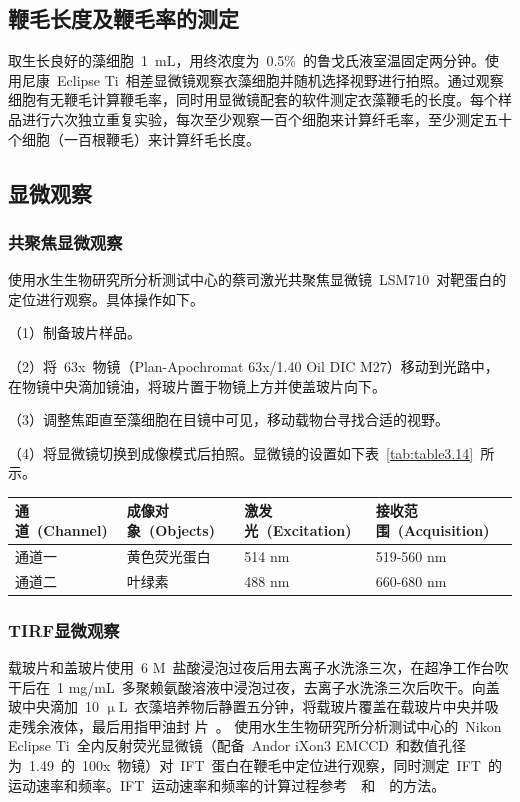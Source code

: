 \subsection{鞭毛长度及鞭毛率的测定}
取生长良好的藻细胞\ \SI{1}{\mL}，用终浓度为\ 0.5\%\ 的鲁戈氏液室温固定两分钟。使用尼康\ Eclipse Ti\ 相差显微镜观察衣藻细胞并随机选择视野进行拍照。通过观察细胞有无鞭毛计算鞭毛率，同时用显微镜配套的软件测定衣藻鞭毛的长度。每个样品进行六次独立重复实验，每次至少观察一百个细胞来计算纤毛率，至少测定五十个细胞（一百根鞭毛）来计算纤毛长度。

\subsection{显微观察}\label{subsec:microscope}
\subsubsection{共聚焦显微观察}
使用水生生物研究所分析测试中心的蔡司激光共聚焦显微镜\ LSM710\ 对靶蛋白的定位进行观察。具体操作如下。

（1）制备玻片样品。

（2）将\ 63x\ 物镜（Plan-Apochromat 63x/1.40 Oil DIC M27）移动到光路中，在物镜中央滴加镜油，将玻片置于物镜上方并使盖玻片向下。

（3）调整焦距直至藻细胞在目镜中可见，移动载物台寻找合适的视野。

（4）将显微镜切换到成像模式后拍照。显微镜的设置如下表\ \ref{tab:table3.14}\ 所示。
\begin{table}[!ht]
\centering
{
\par}
\small
\begin{tabular*}{\textwidth}[c]{@{\extracolsep{\fill}}llll}
\toprule
通道\ (Channel)   & 成像对象\ (Objects)     & 激发光\ (Excitation) & 接收范围\ (Acquisition)\\
\midrule
通道一 & 黄色荧光蛋白 & 514 nm     & 519-560 nm\\
通道二 & 叶绿素       & 488 nm     & 660-680 nm\\
\bottomrule
\end{tabular*}
\end{table}

\subsubsection{TIRF显微观察}
载玻片和盖玻片使用\ 6 M\ 盐酸浸泡过夜后用去离子水洗涤三次，在超净工作台吹干后在\ 1 mg/mL\ 多聚赖氨酸溶液中浸泡过夜，去离子水洗涤三次后吹干。向盖玻中央滴加\ 10 $\upmu$L\ 衣藻培养物后静置五分钟，将载玻片覆盖在载玻片中央并吸走残余液体，最后用指甲油封
片\ \citep{Dentler2009,Fuhrmann1999}。 使用水生生物研究所分析测试中心的\ Nikon Eclipse Ti\ 全内反射荧光显微镜（配备\ Andor iXon3 EMCCD\ 和数值孔径为\ 1.49\ 的\ 100x\ 物镜）对\ IFT\ 蛋白在鞭毛中定位进行观察，同时测定\ IFT\ 的运动速率和频率。IFT\ 运动速率和频率的计算过程参考\
\citet{Lechtreck2013}\ 和\ \citet{Dentler2009}\ 的方法。
